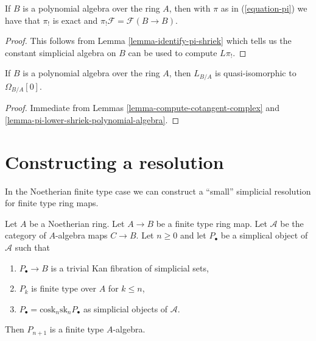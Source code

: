 \begin{lemma}
\label{lemma-pi-lower-shriek-polynomial-algebra}
If $B$ is a polynomial algebra over the ring $A$, then
with $\pi$ as in (\ref{equation-pi}) we have that
$\pi_!$ is exact and $\pi_!\mathcal{F} = \mathcal{F}(B \to B)$.
\end{lemma}

\begin{proof}
This follows from Lemma \ref{lemma-identify-pi-shriek} which tells us
the constant simplicial algebra on $B$ can be used to compute $L\pi_!$.
\end{proof}

\begin{lemma}
\label{lemma-cotangent-complex-polynomial-algebra}
If $B$ is a polynomial algebra over the ring $A$, then
$L_{B/A}$ is quasi-isomorphic to $\Omega_{B/A}[0]$.
\end{lemma}

\begin{proof}
Immediate from
Lemmas \ref{lemma-compute-cotangent-complex} and
\ref{lemma-pi-lower-shriek-polynomial-algebra}.
\end{proof}





\section{Constructing a resolution}
\label{section-polynomial}

\noindent
In the Noetherian finite type case we can construct a ``small'' simplicial
resolution for finite type ring maps.

\begin{lemma}
\label{lemma-polynomial}
Let $A$ be a Noetherian ring. Let $A \to B$ be a finite type ring map.
Let $\mathcal{A}$ be the category of $A$-algebra maps $C \to B$. Let
$n \geq 0$ and let $P_\bullet$ be a simplical object of $\mathcal{A}$
such that
\begin{enumerate}
\item $P_\bullet \to B$ is a trivial Kan fibration of simplicial sets,
\item $P_k$ is finite type over $A$ for $k \leq n$,
\item $P_\bullet = \text{cosk}_n \text{sk}_n P_\bullet$ as simplicial
objects of $\mathcal{A}$.
\end{enumerate}
Then $P_{n + 1}$ is a finite type $A$-algebra.
\end{lemma}

